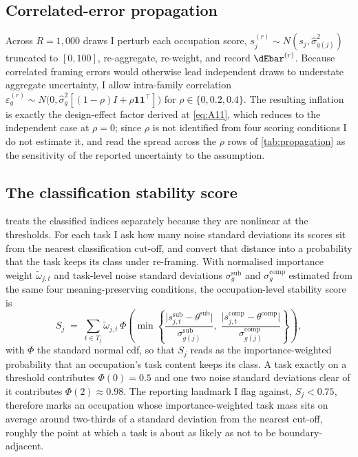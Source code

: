 \subsection{Correlated-error propagation}

Across $R = 1{,}000$ draws I perturb each occupation score, $s^{(r)}_j \sim N(s_j, \widehat{\sigma}^2_{g(j)})$ truncated to $[0,100]$, re-aggregate, re-weight, and record $\dEbar^{(r)}$. Because correlated framing errors would otherwise lead independent draws to understate aggregate uncertainty, I allow intra-family correlation $\varepsilon^{(r)}_g \sim N\bigl(0, \widehat{\sigma}^2_g [(1-\rho)I + \rho \bm{1}\bm{1}^{\top}]\bigr)$ for $\rho \in \{0, 0.2, 0.4\}$. The resulting inflation is exactly the design-effect factor derived at \cref{eq:A11}, which reduces to the independent case at $\rho = 0$; since $\rho$ is not identified from four scoring conditions I do not estimate it, and read the spread across the $\rho$ rows of \cref{tab:propagation} as the sensitivity of the reported uncertainty to the assumption.

\subsection{The classification stability score}

 treats the classified indices separately because they are nonlinear at the thresholds. For each task I ask how many noise standard deviations its scores sit from the nearest classification cut-off, and convert that distance into a probability that the task keeps its class under re-framing. With normalised importance weight $\tilde{\omega}_{j,t}$ and task-level noise standard deviations $\sigma^{\mathrm{sub}}_g$ and $\sigma^{\mathrm{comp}}_g$ estimated from the same four meaning-preserving conditions, the occupation-level stability score is
\begin{equation}\label{eq:stability}
S_j \;=\; \sum_{t \in T_j} \tilde{\omega}_{j,t}\,
\Phi\!\left( \min\!\left\{
\frac{\bigl| s^{\mathrm{sub}}_{j,t} - \theta^{\mathrm{sub}} \bigr|}
     {\sigma^{\mathrm{sub}}_{g(j)}},\;
\frac{\bigl| s^{\mathrm{comp}}_{j,t} - \theta^{\mathrm{comp}} \bigr|}
     {\sigma^{\mathrm{comp}}_{g(j)}}
\right\} \right),
\end{equation}
with $\Phi$ the standard normal cdf, so that $S_j$ reads as the importance-weighted probability that an occupation's task content keeps its class. A task exactly on a threshold contributes $\Phi(0) = 0.5$ and one two noise standard deviations clear of it contributes $\Phi(2) \approx 0.98$. The reporting landmark I flag against, $S_j < 0.75$, therefore marks an occupation whose importance-weighted task mass sits on average around two-thirds of a standard deviation from the nearest cut-off, roughly the point at which a task is about as likely as not to be boundary-adjacent.

